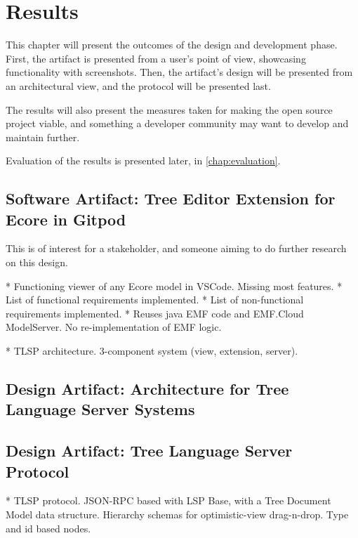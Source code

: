 \chapter{Results}\label{chap:results}

This chapter will present the outcomes of the design and development phase.
First, the artifact is presented from a user's point of view, showcasing functionality with screenshots.
Then, the artifact's design will be presented from an architectural view, and the protocol will be presented last.


The results will also present the measures taken for making the \gls{open source} project viable, and something a developer community may want to develop and maintain further.

Evaluation of the results is presented later, in \cref{chap:evaluation}.

\section{Software Artifact: Tree Editor Extension for Ecore in Gitpod}

This is of interest for a stakeholder, and someone aiming to do further research on this design.



* Functioning viewer of any Ecore model in VSCode. Missing most features.
  * List of functional requirements implemented.
  * List of non-functional requirements implemented.
* Reuses java EMF code and EMF.Cloud ModelServer. No re-implementation of EMF logic.

* TLSP architecture. 3-component system (view, extension, server).


\section{Design Artifact: Architecture for Tree Language Server Systems}




\section{Design Artifact: Tree Language Server Protocol}\label{sec:tlsp}



* TLSP protocol. JSON-RPC based with LSP Base, with a Tree Document Model data structure. Hierarchy schemas for optimistic-view drag-n-drop. Type and id based nodes. 


